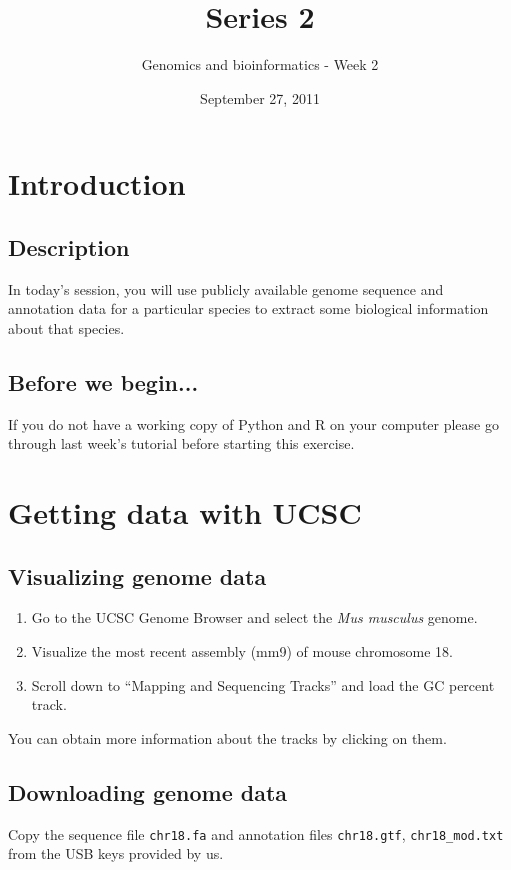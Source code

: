 \documentclass[a4paper,11pt]{article}
\title{Series 2}
\date{September 27, 2011}
\author{Genomics and bioinformatics - Week 2}
\begin{document}
\maketitle



\section{Introduction}
\subsection{Description}
In today's session, you will use publicly available genome sequence and annotation data for \indent a particular species
to extract some biological information about that species.
\subsection{Before we begin...}
If you do not have a working copy of Python and R on your computer please go through last week's tutorial before starting this exercise. 




\section{Getting data with UCSC}
\subsection{Visualizing genome data}
\begin{enumerate}
\item Go to the UCSC Genome Browser and select the \textit{Mus musculus} genome.
\item Visualize the most recent assembly (mm9) of mouse chromosome 18.
\item Scroll down to ``Mapping and Sequencing Tracks'' and load the GC percent track.
\end{enumerate}
You can obtain more information about the tracks by clicking on them.  
\subsection{Downloading genome data}
Copy the sequence file \texttt{chr18.fa} and annotation files \texttt{chr18.gtf}, \texttt{chr18\_mod.txt} from the USB keys provided by us. 
\end{document}
